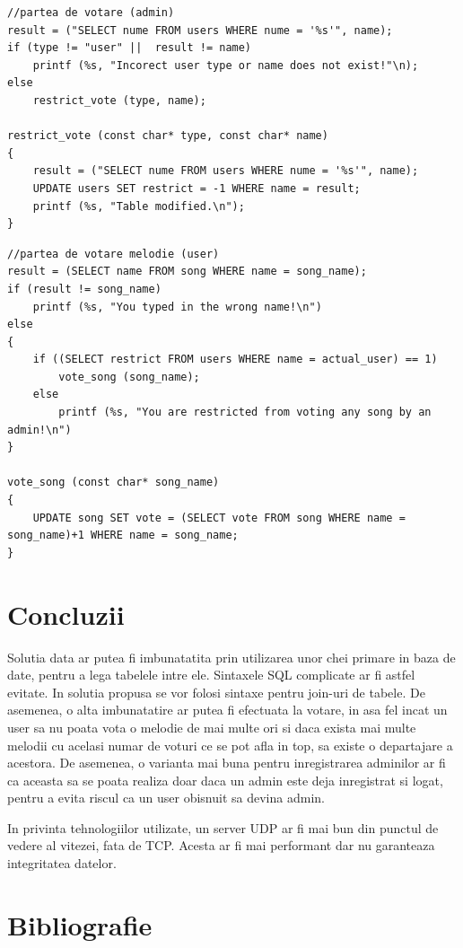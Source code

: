 \documentclass[a4paper]{article}
\begin{document}
\begin{lstlisting}[style=CStyle]
//partea de votare (admin)
result = ("SELECT nume FROM users WHERE nume = '%s'", name);
if (type != "user" ||  result != name)
	printf (%s, "Incorect user type or name does not exist!"\n);
else 
	restrict_vote (type, name);

restrict_vote (const char* type, const char* name)
{
	result = ("SELECT nume FROM users WHERE nume = '%s'", name);
	UPDATE users SET restrict = -1 WHERE name = result;
	printf (%s, "Table modified.\n");
} 
\end{lstlisting}

\begin{lstlisting}[style=CStyle]
//partea de votare melodie (user)
result = (SELECT name FROM song WHERE name = song_name);
if (result != song_name)
	printf (%s, "You typed in the wrong name!\n")
else 
{
	if ((SELECT restrict FROM users WHERE name = actual_user) == 1)
		vote_song (song_name);
	else
		printf (%s, "You are restricted from voting any song by an admin!\n")
}

vote_song (const char* song_name)
{
	UPDATE song SET vote = (SELECT vote FROM song WHERE name = song_name)+1 WHERE name = song_name;
}
\end{lstlisting}

\section{Concluzii}

\quad Solutia data ar putea fi imbunatatita prin utilizarea unor chei primare in baza de date, pentru a lega tabelele intre ele. Sintaxele SQL complicate ar fi astfel evitate. In solutia propusa se vor folosi sintaxe pentru join-uri de tabele. De asemenea, o alta imbunatatire ar putea fi efectuata la votare, in asa fel incat un user sa nu poata vota o melodie de mai multe ori si daca exista mai multe melodii cu acelasi numar de voturi ce se pot afla in top, sa existe o departajare a acestora. De asemenea, o varianta mai buna pentru inregistrarea adminilor ar fi ca aceasta sa se poata realiza doar daca un admin este deja inregistrat si logat, pentru a evita riscul ca un user obisnuit sa devina admin.

In privinta tehnologiilor utilizate, un server UDP ar fi mai bun din punctul de vedere al vitezei, fata de TCP. Acesta ar fi mai performant dar nu garanteaza integritatea datelor.

\section{Bibliografie}
\end{document}
